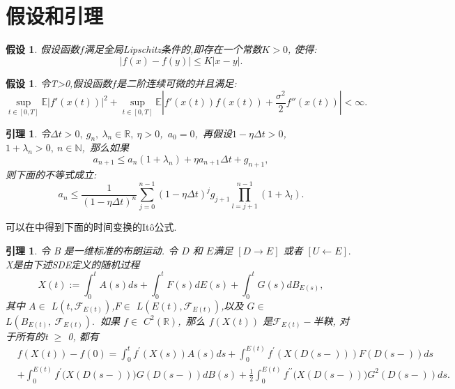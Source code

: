 \documentclass[12pt,final]{article}
\numberwithin{equation}{section}
\numberwithin{figure}{section}
\numberwithin{table}{section}
\theoremstyle{plain}
\newtheorem{Lemma}[Theorem]{引理}      %
\newtheorem{Assumption}[Theorem]{假设} %
\theoremstyle{Definition}
\theoremstyle{Remark}
\begin{document}
	
	\section{假设和引理}
	\begin{Assumption}\label{assum1}
		假设函数$f$满足全局\textnormal{Lipschitz}条件的,即存在一个常数$K>0$, 使得:
		\begin{equation}
			|f(x)-f(y)| \le K|x-y|.
		\end{equation}
	\end{Assumption}
	
	\begin{Assumption}\label{assum2}
		令T>0,假设函数$f$是二阶连续可微的并且满足:
		\begin{equation}
			\sup\limits_{t\in[0,T]}\mathbb{E}\left|f'(x(t))\right|^2+
			\sup\limits_{t\in[0,T]}\mathbb{E}\left|f'(x(t))f(x(t))+
			\frac{\sigma^2}2f''(x(t))\right|<\infty. 
		\end{equation}
	\end{Assumption}
	
	\begin{Lemma}\label{Lemma:1}
		令$\Delta t > 0,~g_n,~\lambda _n \in \mathbb{R},~\eta > 0$,~$a_0=0$,~再假设$1-\eta \Delta t > 0$,~$1 + \lambda _n > 0,~n \in \mathbb{N}$,~那么如果
		\begin{equation*}
			a_{n+1} \leq a_n(1+\lambda _n)+\eta a_{n+1}\Delta t +g_{n+1},
		\end{equation*}
		则下面的不等式成立:
		\begin{equation}
			a_n \leq \frac{1}{(1-\eta\Delta t)^n}\sum\limits_{j=0}^{n-1}(1-\eta\Delta t)^jg_{j+1}\prod\limits_{l=j+1}^{n-1}(1+\lambda _l).
		\end{equation}
	\end{Lemma}
	
	
	可以在\cite{umarov2018beyond}中得到下面的时间变换的It\^{o}公式. 
	\begin{Lemma}\label{ito}
		令 B 是一维标准的布朗运动. 令 $D$ 和 $E$满足 $[ D\longrightarrow E]$ 或者 $[ U\longleftarrow E]. $ X是由下述\textnormal{SDE}定义的随机过程
		$$X{(t)}:=\int_0^tA{(s)}ds+\int_0^tF{(s)}dE{(s)}+\int_0^tG{(s)}dB_{E{(s)}},$$
		其中 $A\in$ $L( t,\mathcal{F} _{E{(t)}})$,$F\in$ $L( E{(t)},\mathcal{F} _{E{(t)}})$,以及 $G\in$ $L( B_{E{(t)}},~\mathcal{F} _{E{(t)}}) . ~$ 如果 $f\in$ $C^2( \mathbb{R} )$,~那么
		$f(X(t))$ 是$\mathcal{F}_{E{(t)}}-$半鞅, 对于所有的t $\ge$ 0, 都有
		$$\begin{aligned}
			&f(X{(t)})-f(0)=\int_{0}^{t}f^{\prime}(X{(s)})A{(s)}ds+\int_{0}^{E{(t)}}f^{\prime}\left(X(D(s-))\right)F(D(s-))ds\\
			&+\int_{0}^{E{(t)}}f^{\prime}\big(X(D(s-))\big)G(D(s-))dB{(s)}+\frac{1}{2}\int_{0}^{E{(t)}}f^{\prime\prime}\big(X(D(s-))\big)G^2(D(s-))ds.
		\end{aligned}$$
	\end{Lemma}
	
\end{document}
